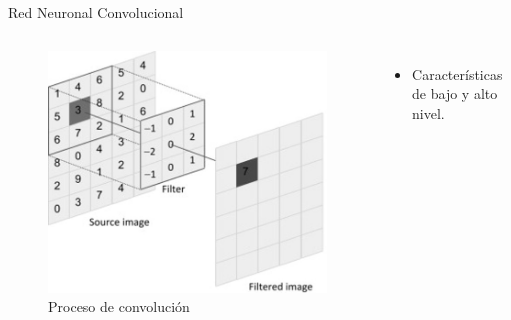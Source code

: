 \documentclass[12pt,aspectratio=169]{beamer}
\begin{document}
\begin{frame}{Red Neuronal Convolucional}
    \begin{columns}[c] 
            \begin{figure}
                \includegraphics[scale=0.4]{figs/conv_2d.jpg}
                \caption{Proceso de convolución}
            \end{figure}
            \begin{itemize}
                \item Características de bajo y alto nivel.
                \vspace{4mm}
                

\end{itemize}
\end{columns}
\end{frame}
\end{document}
